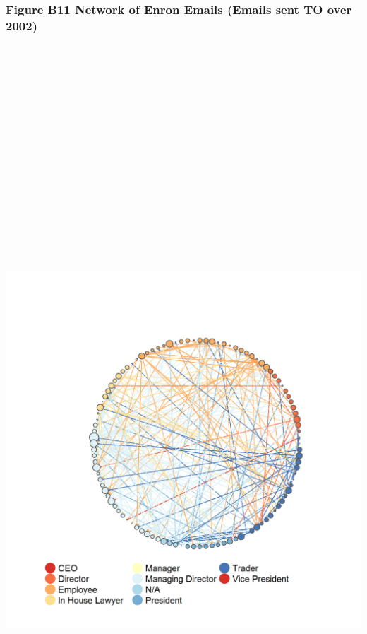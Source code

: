 \documentclass[]{article}
\begin{document}
\newpage

\subsubsection{Figure B11 Network of Enron Emails (Emails sent TO over
2002)}\label{figure-b11-network-of-enron-emails-emails-sent-to-over-2002}

\section{\texorpdfstring{\protect\includegraphics[height=12.50000in]{images/n_to_02e.png}}{Network of Enron Emails}}\label{network-of-enron-emails-8}
\end{document}
